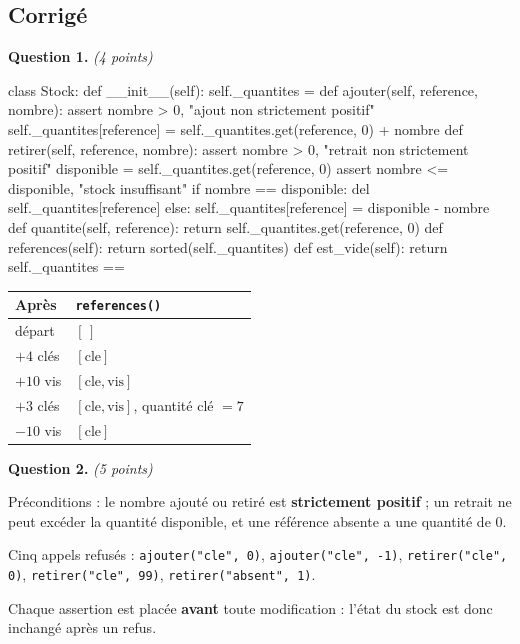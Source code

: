 \subsection*{Corrigé}

\textbf{Question 1.} \emph{(4 points)}

\begin{python}
class Stock:
    def __init__(self):
        self._quantites = {}
    def ajouter(self, reference, nombre):
        assert nombre > 0, "ajout non strictement positif"
        self._quantites[reference] = self._quantites.get(reference, 0) + nombre
    def retirer(self, reference, nombre):
        assert nombre > 0, "retrait non strictement positif"
        disponible = self._quantites.get(reference, 0)
        assert nombre <= disponible, "stock insuffisant"
        if nombre == disponible:
            del self._quantites[reference]
        else:
            self._quantites[reference] = disponible - nombre
    def quantite(self, reference):
        return self._quantites.get(reference, 0)
    def references(self):
        return sorted(self._quantites)
    def est_vide(self):
        return self._quantites == {}
\end{python}

\begin{center}
\begin{tabular}{|l|l|}
\hline
\textbf{Après} & \texttt{references()} \\
\hline
départ & $[\,]$ \\
\hline
$+4$ clés & $[\text{cle}]$ \\
\hline
$+10$ vis & $[\text{cle}, \text{vis}]$ \\
\hline
$+3$ clés & $[\text{cle}, \text{vis}]$, quantité clé $= 7$ \\
\hline
$-10$ vis & $[\text{cle}]$ \\
\hline
\end{tabular}
\end{center}

\medskip
\textbf{Question 2.} \emph{(5 points)}

Préconditions : le nombre ajouté ou retiré est \textbf{strictement positif} ;
un retrait ne peut excéder la quantité disponible, et une référence absente a
une quantité de $0$.

Cinq appels refusés : \lstinline{ajouter("cle", 0)},
\lstinline{ajouter("cle", -1)}, \lstinline{retirer("cle", 0)},
\lstinline{retirer("cle", 99)}, \lstinline{retirer("absent", 1)}.

Chaque assertion est placée \textbf{avant} toute modification : l'état du stock
est donc inchangé après un refus.

